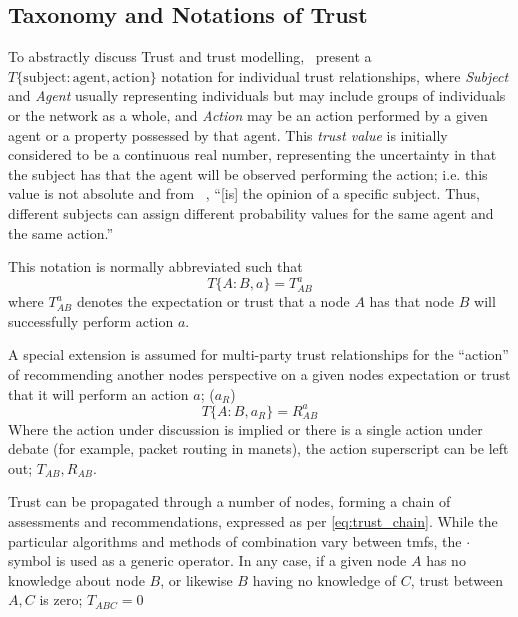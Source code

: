 \pagebreak
\subsection{Taxonomy and Notations of Trust}\label{sec:trust_taxonomy}

To abstractly discuss Trust and trust modelling,~\citet{Liu2006} present a $T\{\text{subject}:\text{agent},\text{action}\}$ notation for individual trust relationships, where \emph{Subject} and \emph{Agent} usually representing individuals but may include groups of individuals or the network as a whole, and \emph{Action} may be an action performed by a given agent or a property possessed by that agent. 
This \emph{trust value} is initially considered to be a continuous real number, representing the uncertainty in that the subject has that the  agent will be observed performing the action; i.e. this value is not absolute and from ~\citet{Sun2008}, ``[is] the opinion of a specific subject. Thus, different subjects can assign different probability values for the same agent and the same action.''

This notation is normally abbreviated such that 
\begin{equation}
  \label{eq:trust_notation}
  T\{A:B,a\} = T^a_{AB}
\end{equation} 
where $T^a_{AB}$ denotes the expectation or trust that a node $A$ has that node $B$ will successfully perform action $a$.

A special extension is assumed for multi-party trust relationships for the ``action'' of recommending another nodes perspective on a given nodes expectation or trust that it will perform an action $a$; ($a_R$)
%
\begin{equation}
  \label{eq:recommendation_notation}
  T\{A:B,a_R\} = R^a_{AB}
\end{equation}
%
Where the action under discussion is implied or there is a single action under debate (for example, packet routing in \glspl{manet}), the action superscript can be left out; $T_{AB} , R_{AB}$.

Trust can be propagated through a number of nodes, forming a chain of assessments and recommendations, expressed as per \eqref{eq:trust_chain}.
While the particular algorithms and methods of combination vary between \glspl{tmf}, the $\cdot$ symbol is used as a generic operator.
In any case, if a given node $A$ has no knowledge about node $B$, or likewise $B$ having no knowledge of $C$, trust between $A,C$ is zero; $T_{ABC} = 0$

